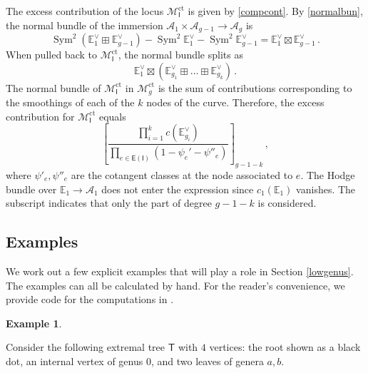 \documentclass[11pt]{amsart}
\theoremstyle{definition}
\newtheorem{example}[thm]{Example}
\newcommand{\M}{\mathcal{M}}
\newcommand{\A}{\mathcal{A}}
\DeclareMathOperator{\ct}{ct}
\DeclareMathOperator{\Sym}{Sym}
\begin{document}
{The excess contribution of the locus $\M_{\mathsf I}^{\ct}$ is given by \eqref{compcont}. By \eqref{normalbun}, the normal bundle of the immersion $\A_1\times \A_{g-1}\to \A_g$ is $$\Sym^2(\mathbb E_1^{\vee}\boxplus \mathbb E_{g-1}^{\vee})-\Sym^2 \mathbb E_1^{\vee}-\Sym^2 \mathbb E_{g-1}^{\vee}=\mathbb E_1^{\vee}\boxtimes \mathbb E_{g-1}^{\vee}\, .$$ When pulled back to $\M_{\mathsf I}^{\ct}$, the normal bundle splits as \begin{equation}\label{normspl}\mathbb E_1^{\vee}\boxtimes (\mathbb E_{g_1}^{\vee}\boxplus \ldots \boxplus \mathbb E^{\vee}_{g_k})\,.\end{equation} The normal bundle of $\M_{\mathsf I}^{\ct}$ in $\M_g^{\ct}$ is the sum of contributions corresponding to the smoothings of each of the $k$ nodes of the curve. Therefore, the excess contribution for $\M_{\mathsf I}^{\ct}$ equals \begin{equation}\label{excess}\left[\frac{\prod_{i=1}^{k}c(\mathbb E^{\vee}_{g_i})}{\prod_{e\in \mathsf{E}(\mathsf{I})} (1-\psi_e'-\psi''_e)}\right]_{g-1-k}\,,\end{equation} where $\psi'_e, \psi''_e$ are the cotangent classes at the node associated to $e$. The Hodge bundle over $\mathbb{E}_1\rightarrow\A_1$ does not enter the expression since $c_1(\mathbb{E}_1)$ vanishes. The subscript indicates that only the part of degree $g-1-k$ is considered. 

\subsection{Examples} We work out a few explicit examples that will play a role in Section \ref{lowgenus}. The examples can all be calculated by hand. For the reader's convenience, we provide code for the computations in  \cite{COP}.

\begin{example}
\label{answer3} 

Consider the following extremal tree $\mathsf{T}$
with $4$ vertices: the root shown as a black dot, an internal vertex of genus $0$, and two leaves of genera $a, b$. 
\begin{center}
\end{center}
\end{example}}
\end{document}
